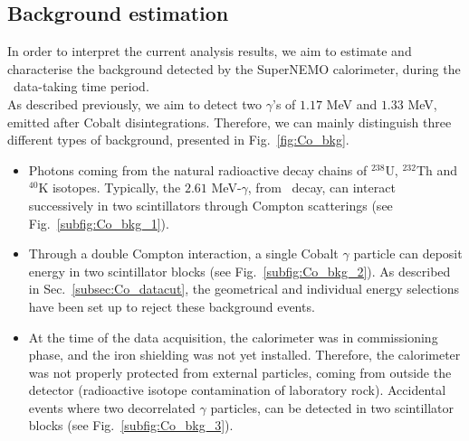 

\subsection{Background estimation}
\label{subsec:bkg_estimation}

In order to interpret the current analysis results, we aim to estimate and characterise the background detected by the SuperNEMO calorimeter, during the \Co\ data-taking time period.\\

As described previously, we aim to detect two $\gamma$'s of $1.17$ MeV and $1.33$ MeV, emitted after Cobalt disintegrations.
Therefore, we can mainly distinguish three different types of background, presented in Fig.~\ref{fig:Co_bkg}.
\begin{itemize}
\item Photons coming from the natural radioactive decay chains of $^{238}$U, $^{232}$Th and $^{40}$K isotopes.
Typically, the $2.61$ MeV-$\gamma$, from \Tl\ decay, can interact successively in two scintillators through Compton scatterings (see Fig.~\ref{subfig:Co_bkg_1}).
\item Through a double Compton interaction, a single Cobalt $\gamma$ particle can deposit energy in two scintillator blocks (see Fig.~\ref{subfig:Co_bkg_2}).
As described in Sec.~\ref{subsec:Co_datacut}, the geometrical and individual energy selections have been set up to reject these background events.
\item At the time of the data acquisition, the calorimeter was in commissioning phase, and the iron shielding was not yet installed.
Therefore, the calorimeter was not properly protected from external particles, coming from outside the detector (radioactive isotope contamination of laboratory rock).
Accidental events where two decorrelated $\gamma$ particles, can be detected in two scintillator blocks (see Fig.~\ref{subfig:Co_bkg_3}).
\end{itemize}

